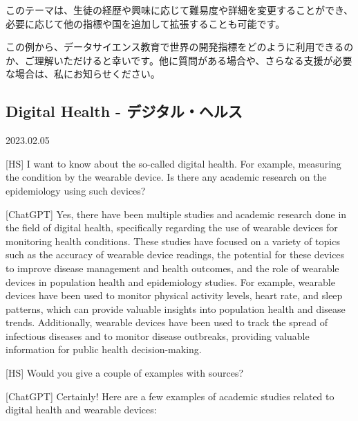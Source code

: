 \documentclass[
]{bxjsbook}
\theoremstyle{definition}
\theoremstyle{definition}
\theoremstyle{definition}
\theoremstyle{definition}
\theoremstyle{remark}
\begin{document}
このテーマは、生徒の経歴や興味に応じて難易度や詳細を変更することができ、必要に応じて他の指標や国を追加して拡張することも可能です。

この例から、データサイエンス教育で世界の開発指標をどのように利用できるのか、ご理解いただけると幸いです。他に質問がある場合や、さらなる支援が必要な場合は、私にお知らせください。

\hypertarget{digitalhealth}{%
\subsection{Digital Health - デジタル・ヘルス　}\label{digitalhealth}}

2023.02.05

{[}HS{]} I want to know about the so-called digital health. For example, measuring the condition by the wearable device. Is there any academic research on the epidemiology using such devices?

{[}ChatGPT{]} Yes, there have been multiple studies and academic research done in the field of digital health, specifically regarding the use of wearable devices for monitoring health conditions. These studies have focused on a variety of topics such as the accuracy of wearable device readings, the potential for these devices to improve disease management and health outcomes, and the role of wearable devices in population health and epidemiology studies. For example, wearable devices have been used to monitor physical activity levels, heart rate, and sleep patterns, which can provide valuable insights into population health and disease trends. Additionally, wearable devices have been used to track the spread of infectious diseases and to monitor disease outbreaks, providing valuable information for public health decision-making.

{[}HS{]} Would you give a couple of examples with sources?

{[}ChatGPT{]} Certainly! Here are a few examples of academic studies related to digital health and wearable devices:
\end{document}
